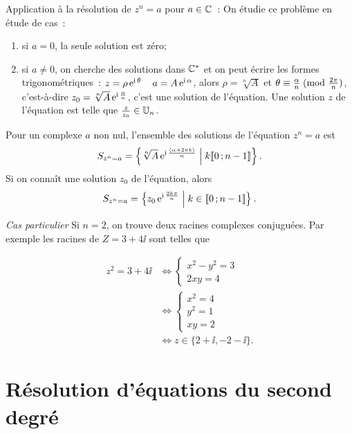 Application à la résolution de \(z^n = a\) pour \(a \in \mathbb{C}\)~: On étudie ce 
problème en étude de cas~:
\begin{enumerate}
  \item si \(a = 0\), la seule solution est zéro;
  \item si \(a \neq 0\), on cherche des solutions dans \(\mathbb{C}^*\) et on peut 
    écrire les formes trigonométriques~: \(z = \rho \operatorname{e}^{\operatorname{i} \theta} \quad a = 
    A \operatorname{e}^{\operatorname{i} \alpha}\), alors \(\rho = \sqrt[n]{A}\) et 
    \(\theta \equiv \frac{\alpha}{n}\!\pmod {\frac{2\pi}{n}}\), c'est-à-dire 
    \(z_0 = \sqrt[n]{A}  \operatorname{e}^{\operatorname{i} \frac{\alpha}{n}}\), c'est une solution de 
    l'équation. Une solution \(z\) de l'équation est telle que 
    \(\frac{z}{z_0} \in \mathbb{U}_n\).
\end{enumerate}

\begin{prop}
  Pour un complexe \(a\) non nul, l'ensemble des solutions de l'équation \(z^n 
  = a\) est
  \begin{equation}
    S_{z^n = a} = \left\{\sqrt[n]{A} \operatorname{e}^{\operatorname{i} \frac{(\alpha + 2\pi k)}{n}}\mathrel{}\middle|\mathrel{}k 
    \mathopen{\llbracket}0\mathclose{}\mathpunct{};n-1\mathclose{\rrbracket}\right\}.
  \end{equation}
  Si on connaît une solution \(z_0\) de l'équation, alors
  \begin{equation}
    S_{z^n = a} = \left\{z_0 \operatorname{e}^{\operatorname{i} \frac{2 k \pi}{n}}\mathrel{}\middle|\mathrel{}k \in 
    \mathopen{\llbracket}0\mathclose{}\mathpunct{};n-1\mathclose{\rrbracket}\right\}.
  \end{equation}
\end{prop}

\emph{Cas particulier}
Si \(n = 2\), on trouve deux racines complexes conjuguées. Par exemple les 
racines de \(Z = 3 + 4\ii\) sont telles que

\begin{align*}
  z^2 = 3 + 4\ii & \iff  \begin{cases} x^2-y^2 = 3 \\ 2xy = 4 \end{cases} \\
    & \iff \begin{cases} x^2 = 4 \\ y^2 = 1 \\ xy = 2 \end{cases} \\
      & \iff z \in \{2 + \ii, -2-\ii\}.
\end{align*}

\section{Résolution d'équations du second degré}
\label{sec:resolutionequationseconddegre}

